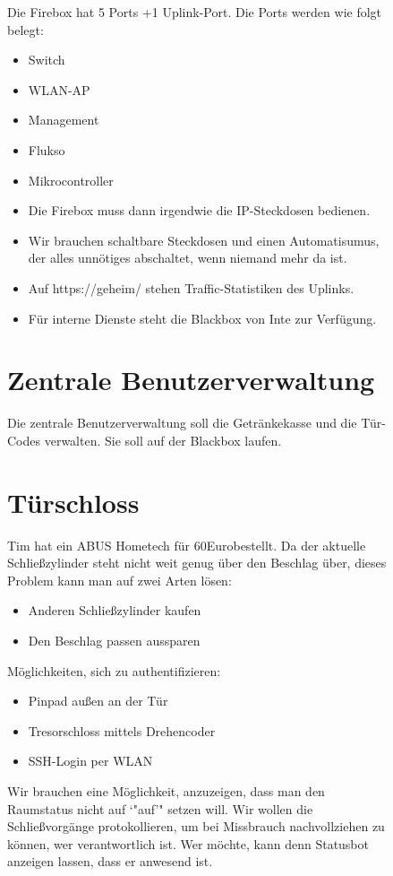 \documentclass[parskip]{scrartcl}
\newcommand\euro{Euro}
\begin{document}
\begin{figure}
\begin{itemize}
\end{itemize}

Die Firebox hat 5 Ports +1 Uplink-Port. Die Ports werden wie folgt belegt:
\begin{itemize}
\item{} Switch
\item{} WLAN-AP
\item{} Management
\item{} Flukso
\item{} Mikrocontroller
\end{itemize}

\begin{itemize}
\item{} Die Firebox muss dann irgendwie die IP-Steckdosen bedienen.
\item{} Wir brauchen schaltbare Steckdosen und einen Automatisumus, der alles unnötiges abschaltet, wenn niemand mehr da ist.
\item{} Auf https://geheim/ stehen Traffic-Statistiken des Uplinks.
\item{} Für interne Dienste steht die Blackbox von Inte zur Verfügung.
\end{itemize}

\end{figure}
\begin{figure}
\section{Zentrale Benutzerverwaltung}

Die zentrale Benutzerverwaltung soll die Getränkekasse und die Tür-Codes verwalten.
Sie soll auf der Blackbox laufen.

\end{figure}
\begin{figure}
\section{Türschloss}

Tim hat ein ABUS Hometech für 60\euro bestellt.
Da der aktuelle Schließzylinder steht nicht weit genug über den Beschlag über, dieses Problem kann man auf zwei Arten lösen:
\begin{itemize}
\item{} Anderen Schließzylinder kaufen
\item{} Den Beschlag passen aussparen
\end{itemize}

Möglichkeiten, sich zu authentifizieren:
\begin{itemize}
\item{} Pinpad außen an der Tür
\item{} Tresorschloss mittels Drehencoder
\item{} SSH-Login per WLAN
\end{itemize}

Wir brauchen eine Möglichkeit, anzuzeigen, dass man den Raumstatus nicht auf `"auf'" setzen will.
Wir wollen die Schließvorgänge protokollieren, um bei Missbrauch nachvollziehen zu können, wer verantwortlich ist.
Wer möchte, kann denn Statusbot anzeigen lassen, dass er anwesend ist.

\end{figure}
\end{document}

